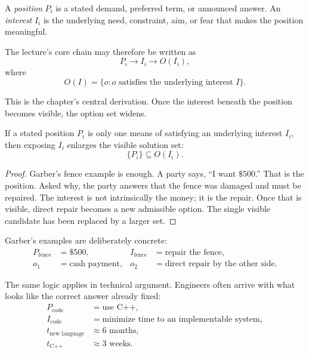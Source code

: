 \begin{definition}
A \emph{position} \(P_i\) is a stated demand, preferred term, or announced answer. An \emph{interest} \(I_i\) is the underlying need, constraint, aim, or fear that makes the position meaningful.
\end{definition}

The lecture's core chain may therefore be written as
\begin{equation}
P_i \longrightarrow I_i \longrightarrow O(I_i),
\end{equation}
where
\begin{equation}
O(I) = \{o : o \text{ satisfies the underlying interest } I\}.
\end{equation}

This is the chapter's central derivation. Once the interest beneath the position becomes visible, the option set widens.

\begin{proposition}
If a stated position \(P_i\) is only one means of satisfying an underlying interest \(I_i\), then exposing \(I_i\) enlarges the visible solution set:
\begin{equation}
\{P_i\} \subseteq O(I_i).
\end{equation}
\end{proposition}

\begin{proof}
Garber's fence example is enough. A party says, ``I want \(\$500\).'' That is the position. Asked why, the party answers that the fence was damaged and must be repaired. The interest is not intrinsically the money; it is the repair. Once that is visible, direct repair becomes a new admissible option. The single visible candidate has been replaced by a larger set.
\end{proof}

Garber's examples are deliberately concrete:
\begin{align}
P_{\text{fence}} &= \$500, &
I_{\text{fence}} &= \text{repair the fence},\\
o_1 &= \text{cash payment}, &
o_2 &= \text{direct repair by the other side}.
\end{align}

The same logic applies in technical argument. Engineers often arrive with what looks like the correct answer already fixed:
\begin{align}
P_{\text{code}} &= \text{use C++},\\
I_{\text{code}} &= \text{minimize time to an implementable system},\\
t_{\text{new language}} &\approx 6 \text{ months},\\
t_{\text{C++}} &\approx 3 \text{ weeks}.
\end{align}


